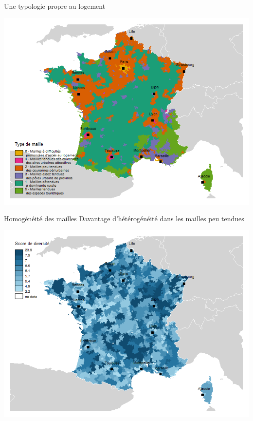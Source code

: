 \documentclass[11pt]{beamer}
\begin{document}
\begin{frame}{Une typologie propre au logement}
\begin{center}
\includegraphics[scale=.55]{img/Typo_mailles}
\end{center}
\end{frame}

\begin{frame}{Homogénéité des mailles}
Davantage d'hétérogénéité dans les mailles peu tendues
\begin{center}
\includegraphics[scale=.5]{img/Diversite}
\end{center}
\end{frame}
\end{document}
